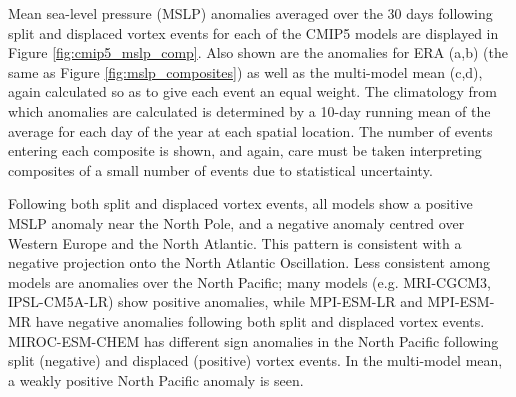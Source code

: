 
Mean sea-level pressure (MSLP) anomalies averaged over the 30 days following
split and displaced vortex events for each of the CMIP5 models are displayed in
Figure \ref{fig:cmip5_mslp_comp}. Also shown are the anomalies for ERA (a,b)
(the same as Figure \ref{fig:mslp_composites}) as well as the multi-model mean
(c,d), again calculated so as to give each event an equal weight. The
climatology from which anomalies are calculated is determined by a 10-day
running mean of the average for each day of the year at each spatial
location. The number of events entering each composite is shown, and again, care
must be taken interpreting composites of a small number of events due to
statistical uncertainty.

Following both split and displaced vortex events, all models show a positive
MSLP anomaly near the North Pole, and a negative anomaly centred over Western
Europe and the North Atlantic. This pattern is consistent with a negative
projection onto the North Atlantic Oscillation. Less consistent among models are
anomalies over the North Pacific; many models (e.g. MRI-CGCM3, IPSL-CM5A-LR)
show positive anomalies, while MPI-ESM-LR and MPI-ESM-MR have negative anomalies
following both split and displaced vortex events. MIROC-ESM-CHEM has different
sign anomalies in the North Pacific following split (negative) and displaced
(positive) vortex events. In the multi-model mean, a weakly positive North
Pacific anomaly is seen.


